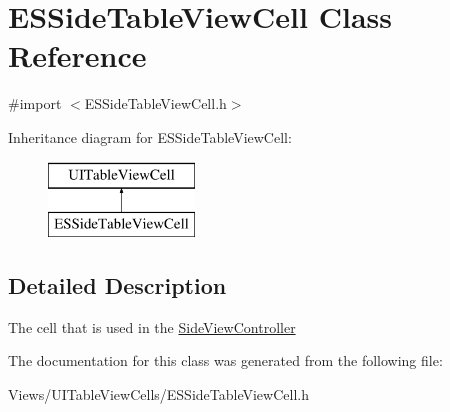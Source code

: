 \hypertarget{interface_e_s_side_table_view_cell}{}\section{E\+S\+Side\+Table\+View\+Cell Class Reference}
\label{interface_e_s_side_table_view_cell}


{\ttfamily \#import $<$E\+S\+Side\+Table\+View\+Cell.\+h$>$}

Inheritance diagram for E\+S\+Side\+Table\+View\+Cell\+:\begin{figure}[H]
\begin{center}
\leavevmode
\includegraphics[height=2.000000cm]{interface_e_s_side_table_view_cell}
\end{center}
\end{figure}


\subsection{Detailed Description}
The cell that is used in the \hyperlink{interface_side_view_controller}{Side\+View\+Controller} 

The documentation for this class was generated from the following file\+:\begin{DoxyCompactItemize}
\item 
Views/\+U\+I\+Table\+View\+Cells/E\+S\+Side\+Table\+View\+Cell.\+h\end{DoxyCompactItemize}
